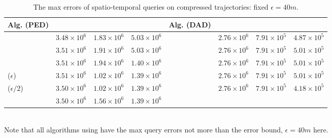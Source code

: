 \begin{table}
	\caption{\small The max errors of spatio-temporal queries on compressed trajectories: fixed $\epsilon=40m$.}
	\centering
	\scriptsize
	\vspace{-1ex}
	\begin{tabular}{|l|c|c|c|l|c|c|c|}
		\hline
		\bf{Alg. (PED)}  &\ucar &\geolife &\mopsi & \bf{Alg. (DAD)}  &\ucar &\geolife &\mopsi \\
		\hline
		{\dpa} &	$3.48 \times 10^6$ & $1.83 \times 10^6$ &	$5.03 \times 10^6$	& \dpa	& $2.76 \times 10^6$	& $7.91 \times 10^5$	& $4.87 \times 10^5$ \\
		\hline
		{\tpa} &	$3.51 \times 10^6$ & $1.91 \times 10^6$ &	$5.03 \times 10^6$	& \tpa	& $2.76 \times 10^6$	& $7.91 \times 10^5$	& $5.01 \times 10^5$ \\
		\hline
		{\bqsa} &	$3.51 \times 10^6$ & $1.94 \times 10^6$ &	$1.40 \times 10^6$	& \opwa	& $2.76 \times 10^6$	& $7.91 \times 10^5$	& $5.01 \times 10^5$ \\
		\hline
		{\siped($\epsilon$)} &	$3.51 \times 10^6$ & $1.02 \times 10^6$ &	$1.39 \times 10^6$	& \interval	& $2.76 \times 10^6$	& $7.91 \times 10^5$	& $5.01 \times 10^5$ \\
		\hline
		{\siped($\epsilon/2$)} &	$3.50 \times 10^6$ & $1.02 \times 10^6$ &	$1.39 \times 10^6$	& \intersec	& $2.76 \times 10^6$	& $7.91 \times 10^5$	& $4.18 \times 10^5$ \\
		\hline
		{\operb} &	$3.50 \times 10^6$ & $1.56 \times 10^6$ &	$1.39 \times 10^6$	& & & & \\
		\hline
	\end{tabular}
	\label{tab:query-me}
	\vspace{0.5ex}
	\\{Note that all algorithms using \sed have the max query errors not more than the error bound, \ie $\epsilon=40m$ here.}
	\vspace{-2ex}
\end{table}


